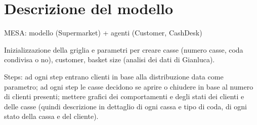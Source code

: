 \chapter{Descrizione del modello}

MESA: modello (Supermarket) + agenti (Customer, CashDesk)

Inizializzazione della griglia e parametri per creare casse (numero casse, coda condivisa o no), customer, basket size (analisi dei dati di Gianluca).

Steps: ad ogni step entrano clienti in base alla distribuzione data come parametro; ad ogni step le casse decidono se aprire o chiudere in base al numero di clienti presenti; mettere grafici dei comportamenti e degli stati dei clienti e delle casse (quindi descrizione in dettaglio di ogni cassa e tipo di coda, di ogni stato della cassa e del cliente).
